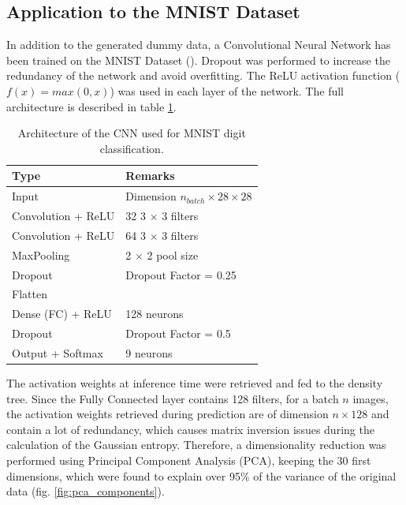 \documentclass{article}
\begin{document}
\subsection{Application to the MNIST Dataset}
In addition to the generated dummy data, a Convolutional Neural Network has been trained on the MNIST Dataset (\cite{mnist}). Dropout was performed to increase the redundancy of the network and avoid overfitting. The ReLU activation function ($f(x) = max(0, x)$) was used in each layer of the network. The full architecture is described in table \ref{table:CNNArchitecture}.

\begin{table}[H]
    \begin{center}
    \begin{tabular}{ll}
    \toprule
    Type & Remarks \\
    \hline
    Input & Dimension $n_{batch} \times 28 \times 28$ \\ 
    Convolution + ReLU & 32 3 $\times$ 3 filters\\
    Convolution + ReLU & 64 3 $\times$ 3 filters\\
    MaxPooling & 2 $\times$ 2 pool size \\
    Dropout & Dropout Factor = 0.25 \\
    \hline
    Flatten & \\
    Dense (FC) + ReLU & 128 neurons\\
    Dropout & Dropout Factor = 0.5 \\
    Output + Softmax & 9 neurons \\
    \bottomrule
    \end{tabular}
    \caption{Architecture of the CNN used for MNIST digit classification.}
    \label{table:CNNArchitecture}
    \end{center}
\end{table}


The activation weights at inference time were retrieved and fed to the density tree. Since the Fully Connected layer contains 128 filters, for a batch $n$ images, the activation weights retrieved during prediction are of dimension $n\times 128$ and contain a lot of redundancy, which causes matrix inversion issues during the calculation of the Gaussian entropy. Therefore, a dimensionality reduction was performed using Principal Component Analysis (PCA), keeping the 30 first dimensions, which were found to explain over 95\% of the variance of the original data (fig. \ref{fig:pca_components}).\\
\end{document}
